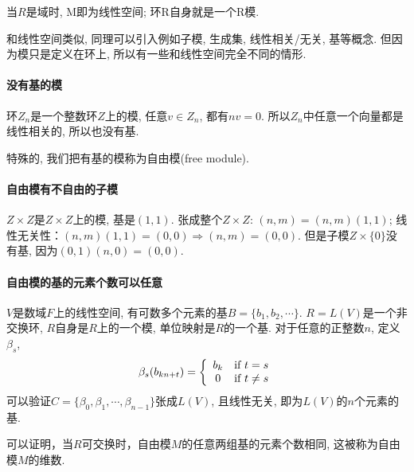 \begin{remark}
	当$R$是域时, M即为线性空间; 环R自身就是一个R模.
\end{remark}

和线性空间类似, 同理可以引入例如子模, 生成集, 线性相关/无关, 基等概念.
但因为模只是定义在环上, 所以有一些和线性空间完全不同的情形.

\paragraph{没有基的模}
环$Z_n$是一个整数环$Z$上的模, 任意$v \in Z_n$, 都有$nv = 0$.
所以$Z_n$中任意一个向量都是线性相关的, 所以也没有基.

\begin{remark}
特殊的, 我们把有基的模称为自由模(free module).
\end{remark}

\paragraph{自由模有不自由的子模}
$Z\times Z$是$Z \times Z$上的模, 基是$(1,1)$.
张成整个$Z\times Z$: $(n,m)=(n,m)(1,1)$;
线性无关性：$(n,m)(1,1)=(0,0) \Rightarrow (n,m)=(0,0)$.
但是子模$Z \times \{0\}$没有基, 因为$(0,1)(n,0) = (0,0)$.

\paragraph{自由模的基的元素个数可以任意}
$V$是数域$F$上的线性空间, 有可数多个元素的基$B = \{b_1, b_2, \cdots\}$.
$R=L(V)$是一个非交换环, $R$自身是$R$上的一个模, 单位映射是$R$的一个基.
对于任意的正整数$n$, 
定义$\beta_s$,
\begin{equation}
\nonumber
\beta_s(b_{kn+t}) = 
\left\{
\begin{array}[]{cc}
	b_k& \text{if } t = s\\
	0  & \text{if } t \ne s\\
\end{array}
\right.
\end{equation}
可以验证$C=\{\beta_0, \beta_1, \cdots, \beta_{n-1}\}$张成$L(V)$,
且线性无关, 即为$L(V)$的$n$个元素的基.

\begin{remark}
	可以证明，当$R$可交换时，自由模$M$的任意两组基的元素个数相同, 
	这被称为自由模$M$的维数.
\end{remark}

